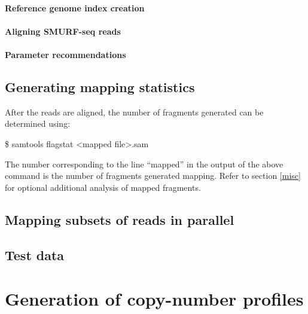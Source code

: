 \documentclass[11pt]{article}
\newenvironment{cmd}
{\list{}{
    \parsep=0em
    \itemindent=17pt
    \listparindent=50pt
    \leftmargin=0in
    \rightmargin=0in
  }\item[] \ttfamily \$}
{\endlist}
\begin{document}
\paragraph{Reference genome index creation}

\paragraph{Aligning SMURF-seq reads}

\paragraph{Parameter recommendations}


\subsection{Generating mapping statistics}
After the reads are aligned, the number of fragments generated can be 
determined using:
\begin{cmd}
  samtools flagstat <mapped file>.sam
\end{cmd}

The number corresponding to the line ``mapped'' in the output of the above
command is the number of fragments generated 
mapping. Refer to section \ref{misc} for optional additional analysis of
mapped fragments.



\subsection{Mapping subsets of reads in parallel}


\subsection{Test data}


\section{Generation of copy-number profiles}
\label{cnv}
\end{document}
